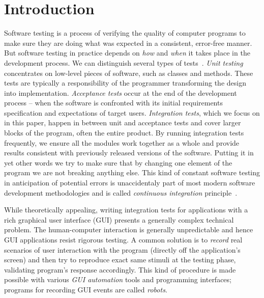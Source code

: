 \documentclass[a4paper,10pt,oneside,final]{dweiss-technote}
\renewcommand{\textsc}[1]{{\scriptsize \MakeUppercase{#1}}}
\begin{document}
\clearpage

\section{Introduction}

Software testing is a process of verifying the quality of computer programs to make sure they are
doing what was expected in a consistent, error-free manner. But software testing in practice depends
on \emph{how} and \emph{when} it takes place in the development process. We can distinguish several
types of tests~\cite{tcs}. \emph{Unit testing} concentrates on low-level pieces of software, such as
classes and methods. These tests are typically a responsibility of the programmer transforming the
design into implementation. \emph{Acceptance tests} occur at the end of the development process --
when the software is confronted with its initial requirements specification and expectations of
target users. \emph{Integration tests}, which we focus on in this paper, happen in between unit and
acceptance tests and cover larger blocks of the program, often the entire product. By running
integration tests frequently, we ensure all the modules work together as a whole and provide results
consistent with previously released versions of the software. Putting it in yet other words we try
to make sure that by changing one element of the program we are not breaking anything else. This
kind of constant software testing in anticipation of potential errors is unaccidentaly part of most
modern software development methodologies and is called \emph{continuous integration}
principle~\cite{fowler}.

While theoretically appealing, writing integration tests for applications with a rich graphical user
interface (\textsc{gui}) presents a generally complex technical problem. The human-computer
interaction is generally unpredictable and hence \textsc{gui} applications resist rigorous testing.
A common solution is to \emph{record} real scenarios of user interaction with the program (directly
off the application's screen) and then try to reproduce exact same stimuli at the testing phase,
validating program's response accordingly. This kind of procedure is made possible with various
\emph{\textsc{gui} automation} tools and programming interfaces; programs for recording \textsc{gui}
events are called \emph{robots}.
\end{document}
